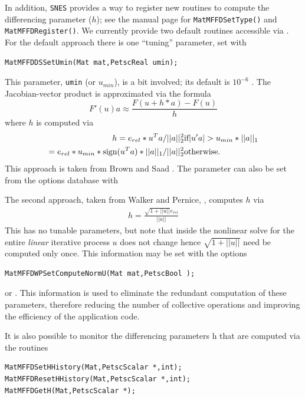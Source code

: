 In addition, \lstinline{SNES} provides a way to register new routines to compute the differencing parameter ($h$);
see the manual page for \lstinline{MatMFFDSetType()} and \lstinline{MatMFFDRegister()}. We currently provide two default routines accessible via
.
For the default approach there is one ``tuning'' parameter, set with
\begin{lstlisting}
MatMFFDDSSetUmin(Mat mat,PetscReal umin);
\end{lstlisting}
This parameter, \lstinline{umin} (or $u_{min}$), is a bit involved; its default is
$ 10^{-6} $ . The Jacobian-vector product is approximated via the formula
\[
    F'(u) a \approx \frac{F(u + h*a) - F(u)}{h}
\]
where $ h $ is computed via
\begin{eqnarray*}
h = e_{rel}*u^{T}a/||a||^2_2                                 & \hbox{if}  |u'a| > u_{min}*||a||_{1} \\
  = e_{rel}*u_{min}*\text{sign}(u^{T}a)*||a||_{1}/||a||^2_2  & \hbox{otherwise}.
\end{eqnarray*}
This approach is taken from Brown and Saad \cite{brownsaad:90}.
The parameter can also be set from the options database with

The second approach, taken from Walker and Pernice, \cite{pw98}, computes $ h $ via
\begin{eqnarray*}
        h = \frac{\sqrt{1 + ||u||}e_{rel}}{||a||}
\end{eqnarray*}
This has no tunable parameters, but note that inside the nonlinear solve for
the entire \emph{linear} iterative process $ u $ does not change hence
$\sqrt{1 + ||u||} $ need be computed only once. This information may be set with the
options
\begin{lstlisting}
MatMFFDWPSetComputeNormU(Mat mat,PetscBool );
\end{lstlisting}
or .
This information is used to eliminate the redundant computation of these parameters,
therefore reducing the number of collective operations and improving the efficiency of the
         application code.

It is also possible to monitor the differencing parameters h that are computed
via the routines
\begin{lstlisting}
MatMFFDSetHHistory(Mat,PetscScalar *,int);
MatMFFDResetHHistory(Mat,PetscScalar *,int);
MatMFFDGetH(Mat,PetscScalar *);
\end{lstlisting}


